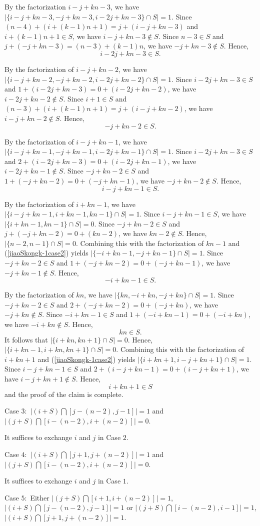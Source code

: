 \documentclass[preprint]{elsarticle}
\begin{document}
By the factorization $i-j+kn-3$,
we have $|\{i-j+kn-3,-j+kn-3,i-2j+kn-3\}\cap S|=1$.
Since $(n-4)+(i+(k-1)n+1)=j+(i-j+kn-3)$ and $i+(k-1)n+1\in S$, we have $i-j+kn-3\not\in S$.
Since $n-3\in S$ and $j+(-j+kn-3)=(n-3)+(k-1)n$, we have $-j+kn-3\not\in S$.
Hence, $$i-2j+kn-3\in S.$$

By the factorization of $i-j+kn-2$,
we have $|\{i-j+kn-2,-j+kn-2,i-2j+kn-2\}\cap S|=1$.
Since $i-2j+kn-3\in S$ and $1+(i-2j+kn-3)=0+(i-2j+kn-2)$, we have $i-2j+kn-2\not\in S$.
Since $i+1\in S$ and $(n-3)+(i+(k-1)n+1)=j+(i-j+kn-2)$, we have $i-j+kn-2\not\in S$.
Hence, $$-j+kn-2\in S.$$

By the factorization of $i-j+kn-1$,
we have $|\{i-j+kn-1,-j+kn-1,i-2j+kn-1\}\cap S|=1$.
Since $i-2j+kn-3\in S$ and $2+(i-2j+kn-3)=0+(i-2j+kn-1)$, we have $i-2j+kn-1\not\in S$.
Since $-j+kn-2\in S$ and $1+(-j+kn-2)=0+(-j+kn-1)$, we have $-j+kn-2\not\in S$.
Hence, $$i-j+kn-1\in S.$$

By the factorization of $i+kn-1$,
we have $|\{i-j+kn-1,i+kn-1,kn-1\}\cap S|=1$.
Since $i-j+kn-1\in S$, we have $|\{i+kn-1,kn-1\}\cap S|=0$.
Since $-j+kn-2\in S$ and $j+(-j+kn-2)=0+(kn-2)$, we have $kn-2\not\in S$.
Hence, $|\{n-2,n-1\}\cap S|=0$.
Combining this with the factorization of $kn-1$ and (\ref{jiaoSkongk-1case2}) yields $|\{-i+kn-1,-j+kn-1\}\cap S|=1$.
Since $-j+kn-2\in S$ and $1+(-j+kn-2)=0+(-j+kn-1)$, we have $-j+kn-1\not\in S$.
Hence, $$-i+kn-1\in S.$$

By the factorization of $kn$,
we have $|\{kn,-i+kn,-j+kn\}\cap S|=1$.
Since $-j+kn-2\in S$ and $2+(-j+kn-2)=0+(-j+kn)$, we have $-j+kn\not\in S$.
Since $-i+kn-1\in S$ and $1+(-i+kn-1)=0+(-i+kn)$, we have $-i+kn\not\in S$.
Hence, $$kn\in S.$$
It follows that $|\{i+kn,kn+1\}\cap S|=0$.
Hence, $|\{i+kn-1,i+kn,kn+1\}\cap S|=0$.
Combining this with the factorization of $i+kn+1$ and (\ref{jiaoSkongk-1case2}) yields $|\{i+kn+1,i-j+kn+1\}\cap S|=1$.
Since $i-j+kn-1\in S$ and $2+(i-j+kn-1)=0+(i-j+kn+1)$, we have $i-j+kn+1\not\in S$.
Hence, $$i+kn+1\in S$$
and the proof of the claim is complete.

Case $3:$ $|(i+S)\bigcap [j-(n-2),j-1]|=1$ and $|(j+S)\bigcap [i-(n-2),i+(n-2)]|=0$.

It suffices to exchange $i$ and $j$ in Case $2$.

Case $4:$ $|(i+S)\bigcap [j+1,j+(n-2)]|=1$ and $|(j+S)\bigcap [i-(n-2),i+(n-2)]|=0$.

It suffices to exchange $i$ and $j$ in Case $1$.

Case $5:$ Either $|(j+S)\bigcap [i+1,i+(n-2)]|=1$, $|(i+S)\bigcap [j-(n-2),j-1]|=1$
or $|(j+S)\bigcap [i-(n-2),i-1]|=1$, $|(i+S)\bigcap [j+1,j+(n-2)]|=1$.
\end{document}
